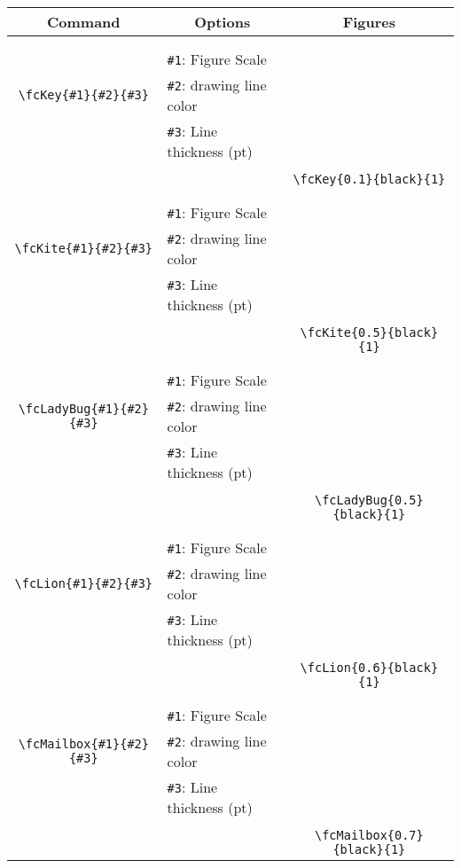 \documentclass[x11names]{article}
\begin{document}
\begin{table}[H]\centering\begin{tabular}{|c|l|c|}\hline {\bf Command}& \multicolumn{1}{c|}{{\bf Options}} & {\bf Figures}\\  \hline	&&\multirow{5}{*}{\fcKey{0.1}{black}{1}}\\	&&\\	&\verb|#1|: Figure Scale &\\	\verb|\fcKey{#1}{#2}{#3}|&	\verb|#2|: drawing line color &\\	&\verb|#3|: Line thickness (pt) &\\ &&\\&&	\verb|\fcKey{0.1}{black}{1}|\\\hline 	
	&&\multirow{5}{*}{\fcKite{0.5}{black}{1}}\\	&&\\	&\verb|#1|: Figure Scale &\\	\verb|\fcKite{#1}{#2}{#3}|&	\verb|#2|: drawing line color &\\	&\verb|#3|: Line thickness (pt) &\\ &&\\&&	\verb|\fcKite{0.5}{black}{1}|\\\hline 	
	&&\multirow{5}{*}{\fcLadyBug{0.5}{black}{1}}\\	&&\\	&\verb|#1|: Figure Scale &\\	\verb|\fcLadyBug{#1}{#2}{#3}|&	\verb|#2|: drawing line color &\\	&\verb|#3|: Line thickness (pt) &\\ &&\\&&	\verb|\fcLadyBug{0.5}{black}{1}|\\\hline 	
	&&\multirow{5}{*}{\fcLion{0.6}{black}{1}}\\	&&\\	&\verb|#1|: Figure Scale &\\	\verb|\fcLion{#1}{#2}{#3}|&	\verb|#2|: drawing line color &\\	&\verb|#3|: Line thickness (pt) &\\ &&\\&&	\verb|\fcLion{0.6}{black}{1}|\\\hline 	
	&&\multirow{5}{*}{\fcMailbox{0.7}{black}{1}}\\	&&\\	&\verb|#1|: Figure Scale &\\	\verb|\fcMailbox{#1}{#2}{#3}|&	\verb|#2|: drawing line color &\\	&\verb|#3|: Line thickness (pt) &\\ &&\\&&	\verb|\fcMailbox{0.7}{black}{1}|\\\hline 	

\end{tabular}
\end{table}
\end{document}
